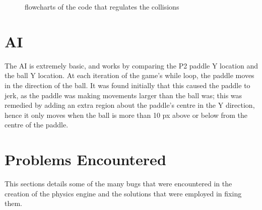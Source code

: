 \documentclass[a4paper,12pt]{article}
\begin{document}
\begin{flushleft}
\begin{figure}[H]
    \qquad
    \caption{flowcharts of the code that regulates the collisions}%
    \label{fig:example}%
\end{figure}

\section{AI}
The AI is extremely basic, and works by comparing the P2 paddle Y location and the ball Y location. At each iteration of the game's while loop, the paddle moves in the direction of the ball. It was found initially that this caused the paddle to jerk, as the paddle was making movements larger than the ball was; this was remedied by adding an extra region about the paddle's centre in the Y direction, hence it only moves when the ball is more than 10 px above or below from the centre of the paddle.

\end{flushleft}
\newpage
\section{Problems Encountered}
\begin{flushleft}
This sections details some of the many bugs that were encountered in the creation of the physics engine and the solutions that were employed in fixing them.
\end{flushleft}
\end{document}
